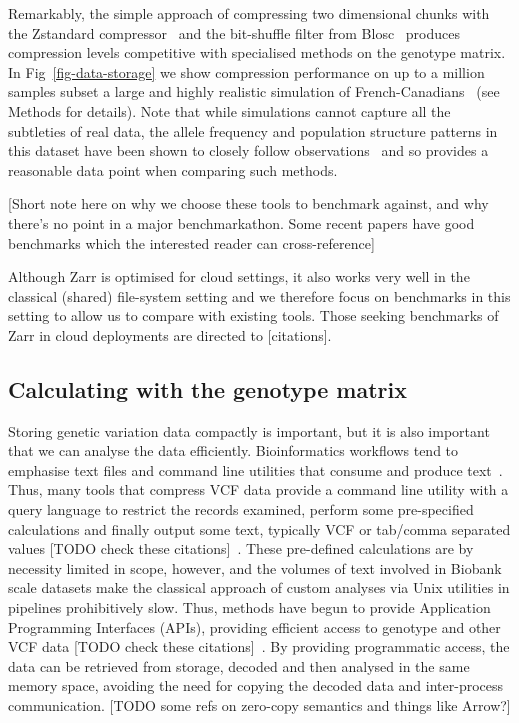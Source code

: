 \documentclass[a4paper,num-refs]{oup-contemporary}
\begin{document}
Remarkably, the simple approach of compressing
two dimensional chunks with the Zstandard 
compressor~\citep{collet2021rfc} and the bit-shuffle
filter from Blosc~\cite{alted2010modern} produces 
compression levels competitive with specialised methods
on the genotype matrix. In Fig~\ref{fig-data-storage}
we show compression performance on up to a million
samples subset a large and highly realistic 
simulation of French-Canadians~\cite{anderson2023on}
(see Methods for details).
Note that while simulations cannot capture 
all the subtleties of real data, the allele frequency
and population structure patterns in this dataset 
have been shown to closely follow 
observations~\cite{anderson2023on} and so provides 
a reasonable data point when comparing such methods.

[Short note here on why we choose these tools to
benchmark against, and why there's no point in 
a major benchmarkathon. Some recent papers 
have good benchmarks which the interested 
reader can cross-reference]

Although Zarr is optimised for cloud settings, it also
works very well in the classical (shared) file-system setting
and we therefore focus on benchmarks in this setting
to allow us to compare with existing tools.
Those seeking benchmarks of Zarr in cloud deployments are 
directed to [citations].


\subsection{Calculating with the genotype matrix}
Storing genetic variation data compactly is important, but it is also
important that we can analyse the data efficiently. Bioinformatics 
workflows tend to emphasise text files and command line utilities 
that consume and produce text~\citep[e.g.][]{buffalo2015bioinformatics}. 
Thus, many tools that compress VCF data provide a command line 
utility with a query language to restrict the records
examined, perform some pre-specified calculations and finally 
output some text, typically VCF or tab/comma separated values
[TODO check these citations]~\citep{
layer2016efficient, %
li2016bgt, %
tatwawadi2016gtrac, %
danek2018gtc, %
lin2020sparse, %
lan2020genozip,lan2021genozip, %
lefaive2021sparse, %
wertenbroek2022xsi,%
zhang2023gbc}. %
These pre-defined calculations are by necessity limited in scope, however,
and the volumes of text involved in Biobank scale datasets
make the classical approach of custom
analyses via Unix utilities in pipelines prohibitively slow. Thus, 
methods have begun to provide Application Programming Interfaces
(APIs), providing efficient access to genotype and other VCF data
[TODO check these citations]~\cite[e.g.][]{kelleher2013processing,lefaive2021sparse,
wertenbroek2022xsi,zhang2023gbc}. By providing programmatic access,
the data can be retrieved from storage, decoded and then analysed
in the same memory space, avoiding the need for copying
the decoded data and inter-process communication. [TODO some refs
on zero-copy semantics and things like Arrow?]
\end{document}
